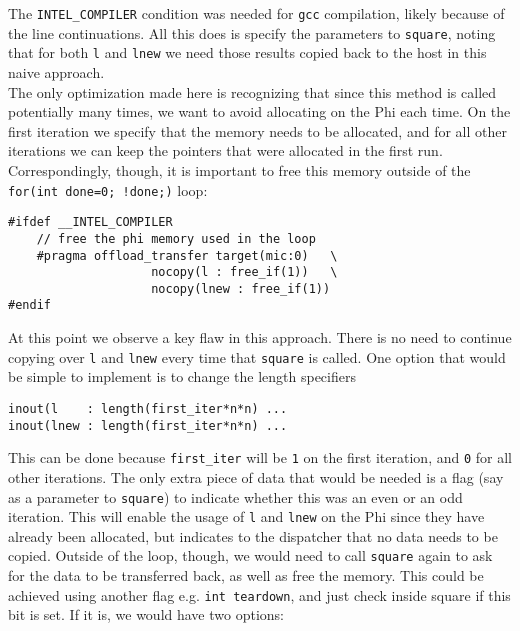 \documentclass[11pt]{article}
\begin{document}
\noindent The \texttt{INTEL\_COMPILER} condition was needed for \texttt{gcc} compilation, likely because of the line continuations.  All this does is specify the parameters to \texttt{square}, noting that for both \texttt{l} and \texttt{lnew} we need those results copied back to the host in this naive approach.\\

\noindent The only optimization made here is recognizing that since this method is called potentially many times, we want to avoid allocating on the Phi each time.  On the first iteration we specify that the memory needs to be allocated, and for all other iterations we can keep the pointers that were allocated in the first run.  Correspondingly, though, it is important to free this memory outside of the \texttt{for(int done=0; !done;)} loop:

\begin{lstlisting}
#ifdef __INTEL_COMPILER
    // free the phi memory used in the loop
    #pragma offload_transfer target(mic:0)   \
                    nocopy(l : free_if(1))   \
                    nocopy(lnew : free_if(1))
#endif
\end{lstlisting}

\noindent At this point we observe a key flaw in this approach.  There is no need to continue copying over \texttt{l} and \texttt{lnew} every time that \texttt{square} is called.  One option that would be simple to implement is to change the length specifiers

\begin{lstlisting}
inout(l    : length(first_iter*n*n) ...
inout(lnew : length(first_iter*n*n) ...
\end{lstlisting}

\noindent This can be done because \texttt{first\_iter} will be \texttt{1} on the first iteration, and \texttt{0} for all other iterations.  The only extra piece of data that would be needed is a flag (say as a parameter to \texttt{square}) to indicate whether this was an even or an odd iteration.  This will enable the usage of \texttt{l} and \texttt{lnew} on the Phi since they have already been allocated, but indicates to the dispatcher that no data needs to be copied.  Outside of the loop, though, we would need to call \texttt{square} again to ask for the data to be transferred back, as well as free the memory.  This could be achieved using another flag e.g. \texttt{int teardown}, and just check inside square if this bit is set.  If it is, we would have two options:
\end{document}
